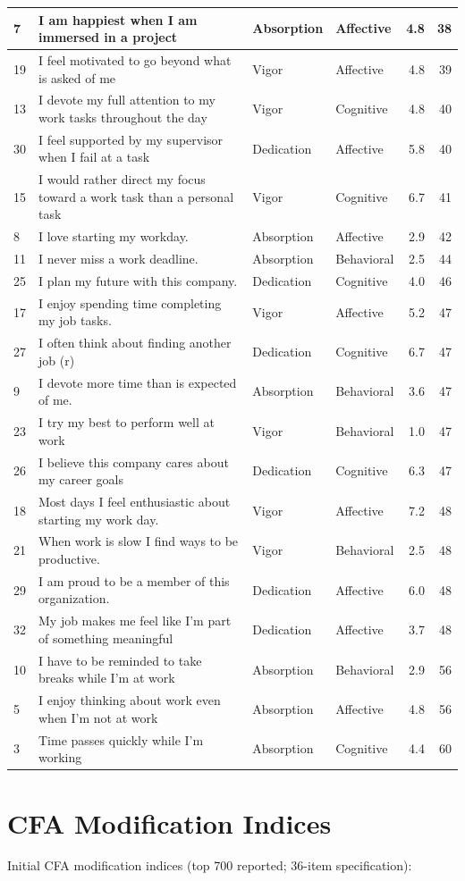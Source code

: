 \documentclass[
]{book}
\begin{document}
\begin{table}
\begin{tabular}[t]{l|l|l|l|r|r}
\hline
7 & I am happiest when I am immersed in a project & Absorption & Affective & 4.8 & 38\\
\hline
19 & I feel motivated to go beyond what is asked of me & Vigor & Affective & 4.8 & 39\\
\hline
13 & I devote my full attention to my work tasks throughout the day & Vigor & Cognitive & 4.8 & 40\\
\hline
30 & I feel supported by my supervisor when I fail at a task & Dedication & Affective & 5.8 & 40\\
\hline
15 & I would rather direct my focus toward a work task than a personal task & Vigor & Cognitive & 6.7 & 41\\
\hline
8 & I love starting my workday. & Absorption & Affective & 2.9 & 42\\
\hline
11 & I never miss a work deadline. & Absorption & Behavioral & 2.5 & 44\\
\hline
25 & I plan my future with this company. & Dedication & Cognitive & 4.0 & 46\\
\hline
17 & I enjoy spending time completing my job tasks. & Vigor & Affective & 5.2 & 47\\
\hline
27 & I often think about finding another job (r) & Dedication & Cognitive & 6.7 & 47\\
\hline
9 & I devote more time than is expected of me. & Absorption & Behavioral & 3.6 & 47\\
\hline
23 & I try my best to perform well at work & Vigor & Behavioral & 1.0 & 47\\
\hline
26 & I believe this company cares about my career goals & Dedication & Cognitive & 6.3 & 47\\
\hline
18 & Most days I feel enthusiastic about starting my work day. & Vigor & Affective & 7.2 & 48\\
\hline
21 & When work is slow I find ways to be productive. & Vigor & Behavioral & 2.5 & 48\\
\hline
29 & I am proud to be a member of this organization. & Dedication & Affective & 6.0 & 48\\
\hline
32 & My job makes me feel like I’m part of something meaningful & Dedication & Affective & 3.7 & 48\\
\hline
10 & I have to be reminded to take breaks while I’m at work & Absorption & Behavioral & 2.9 & 56\\
\hline
5 & I enjoy thinking about work even when I’m not at work & Absorption & Affective & 4.8 & 56\\
\hline
3 & Time passes quickly while I’m working & Absorption & Cognitive & 4.4 & 60\\
\hline
\end{tabular}
\end{table}

\hypertarget{mods}{%
\chapter{CFA Modification Indices}\label{mods}}

Initial CFA modification indices (top 700 reported; 36-item specification):

\hypertarget{htmlwidget-d371a2175f16232dde85}{}

  
\end{document}
